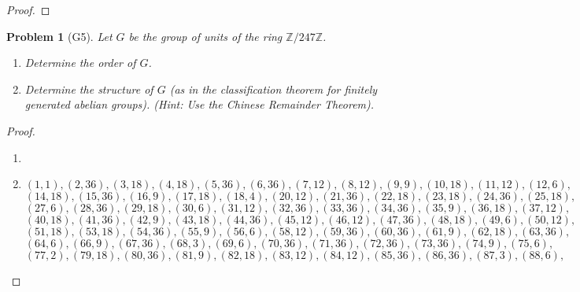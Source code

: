 \documentclass[10pt]{article}
\newcommand{\sk}{\vskip 10mm}
\newcommand{\bb}[1]{\mathbb{#1}}
\theoremstyle{plain}
\newtheorem{problem}{Problem}
\theoremstyle{remark}
\begin{document}
\begin{proof}
  
\end{proof}

\sk


\begin{problem}[G5]
  Let $G$ be the group of units of the ring $\bb{Z}/247\bb{Z}$.
  \begin{enumerate}
  \item Determine the order of $G$.
  \item Determine the structure of $G$ (as in the classification theorem for
    finitely generated abelian groups).
    (Hint: Use the Chinese Remainder Theorem).
  \end{enumerate}
\end{problem}

\begin{proof}
  \begin{enumerate}
  \item
  \item \[ \left(1, 1\right), \left(2, 36\right), \left(3, 18\right), \left(4, 18\right), \left(5, 36\right), \left(6, 36\right), \left(7, 12\right), \left(8, 12\right), \left(9, 9\right), \left(10, 18\right), \left(11, 12\right), \left(12, 6\right),\]
    \[ \left(14, 18\right), \left(15, 36\right), \left(16, 9\right), \left(17, 18\right), \left(18, 4\right), \left(20, 12\right), \left(21, 36\right), \left(22, 18\right), \left(23, 18\right), \left(24, 36\right), \left(25, 18\right),\]
    \[ \left(27, 6\right), \left(28, 36\right), \left(29, 18\right), \left(30, 6\right), \left(31, 12\right), \left(32, 36\right), \left(33, 36\right), \left(34, 36\right), \left(35, 9\right), \left(36, 18\right), \left(37, 12\right),\]
    \[\left(40, 18\right), \left(41, 36\right), \left(42, 9\right), \left(43, 18\right), \left(44, 36\right), \left(45, 12\right), \left(46, 12\right), \left(47, 36\right), \left(48, 18\right), \left(49, 6\right), \left(50, 12\right),\]
    \[ \left(51, 18\right), \left(53, 18\right), \left(54, 36\right), \left(55, 9\right), \left(56, 6\right), \left(58, 12\right), \left(59, 36\right), \left(60, 36\right), \left(61, 9\right), \left(62, 18\right), \left(63, 36\right),\]
    \[ \left(64, 6\right), \left(66, 9\right), \left(67, 36\right), \left(68, 3\right), \left(69, 6\right), \left(70, 36\right), \left(71, 36\right), \left(72, 36\right), \left(73, 36\right), \left(74, 9\right), \left(75, 6\right),\]
    \[ \left(77, 2\right), \left(79, 18\right), \left(80, 36\right), \left(81, 9\right), \left(82, 18\right), \left(83, 12\right), \left(84, 12\right), \left(85, 36\right), \left(86, 36\right), \left(87, 3\right), \left(88, 6\right),\]

\end{enumerate}
\end{proof}
\end{document}
